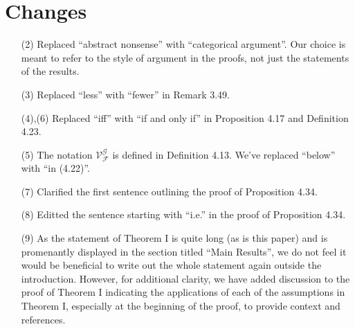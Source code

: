 \documentclass[a4paper,10pt
]{article}%
\numberwithin{equation}{section}
\numberwithin{figure}{section}
\theoremstyle{definition} %
\newcommand{\1}{\ensuremath{\mathbbm 1}}%
\begin{document}
\section*{Changes}
\begin{enumerate}
\item[(2)] Replaced ``abstract nonsense'' with ``categorical argument''. Our choice is meant to refer to the style of argument in the proofs, not just the statements of the results.
\item[(3)] Replaced ``less'' with ``fewer'' in Remark 3.49.
\item[(4),(6)] Replaced ``iff'' with ``if and only if'' in Proposition 4.17 and Definition 4.23.
\item[(5)] The notation $\mathcal V^{\mathcal G}_{\mathcal F}$ is defined in Definition 4.13.
        We've replaced ``below'' with ``in (4.22)''.
\item[(7)] Clarified the first sentence outlining the proof of Proposition 4.34.
\item[(8)] Editted the sentence starting with ``i.e.'' in the proof of Proposition 4.34.
\item[(9)] As the statement of Theorem I is quite long (as is this paper) and is promenantly displayed in the section titled ``Main Results'', we do not feel it would be beneficial to write out the whole statement again outside the introduction.
        However, for additional clarity, we have added discussion to the proof of Theorem I indicating the applications of each of the assumptions in Theorem I, especially at the beginning of the proof, to provide context and references.
\end{enumerate}
\end{document}
